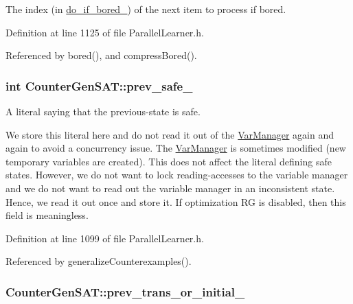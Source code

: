 The index (in \hyperlink{classCounterGenSAT_ae4f7bf80b40a44580fde913f300ac4c1}{do\-\_\-if\-\_\-bored\-\_\-}) of the next item to process if bored. 



Definition at line 1125 of file Parallel\-Learner.\-h.



Referenced by bored(), and compress\-Bored().

\hypertarget{classCounterGenSAT_a6b1ebfdef38c7463a2594ace7bd72a8d}{
\subsubsection[{prev\-\_\-safe\-\_\-}]{\setlength{\rightskip}{0pt plus 5cm}int Counter\-Gen\-S\-A\-T\-::prev\-\_\-safe\-\_\-\hspace{0.3cm}{\ttfamily [protected]}}}\label{classCounterGenSAT_a6b1ebfdef38c7463a2594ace7bd72a8d}


A literal saying that the previous-\/state is safe. 

We store this literal here and do not read it out of the \hyperlink{classVarManager}{Var\-Manager} again and again to avoid a concurrency issue. The \hyperlink{classVarManager}{Var\-Manager} is sometimes modified (new temporary variables are created). This does not affect the literal defining safe states. However, we do not want to lock reading-\/accesses to the variable manager and we do not want to read out the variable manager in an inconsistent state. Hence, we read it out once and store it. If optimization R\-G is disabled, then this field is meaningless. 

Definition at line 1099 of file Parallel\-Learner.\-h.



Referenced by generalize\-Counterexamples().

\hypertarget{classCounterGenSAT_a526507443918740c5ac2ae24886d1017}{
\subsubsection[{prev\-\_\-trans\-\_\-or\-\_\-initial\-\_\-}]{ Counter\-Gen\-S\-A\-T\-::prev\-\_\-trans\-\_\-or\-\_\-initial\-\_\-\hspace{0.3cm}{\ttfamily [protected]}}}\label{classCounterGenSAT_a526507443918740c5ac2ae24886d1017}


